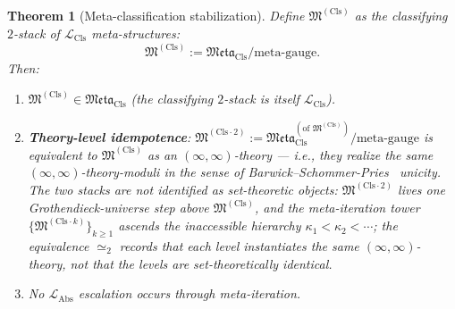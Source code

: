\documentclass[11pt]{article}
\theoremstyle{plain}
\newtheorem{theorem}{Theorem}[section]
\theoremstyle{definition}
\newcommand{\fM}{\mathfrak{M}}
\newcommand{\Meta}{\mathfrak{Meta}}
\newcommand{\LCls}{\mathcal{L}_{\mathrm{Cls}}}
\newcommand{\LAbs}{\mathcal{L}_{\mathrm{Abs}}}
\begin{document}
\begin{theorem}[Meta-classification stabilization]\label{thm:meta-stab}
Define $\fM^{(\mathrm{Cls})}$ as the classifying $2$-stack of $\LCls$ meta-structures:
\[ \fM^{(\mathrm{Cls})} := \Meta_{\mathrm{Cls}} / \text{meta-gauge}. \]
Then:
\begin{enumerate}
\item[\textbf{(a)}] $\fM^{(\mathrm{Cls})} \in \Meta_{\mathrm{Cls}}$ (the classifying $2$-stack is itself $\LCls$).
\item[\textbf{(b)}] \textbf{Theory-level idempotence}: $\fM^{(\mathrm{Cls}\cdot 2)} := \Meta_{\mathrm{Cls}}^{(\text{of }\fM^{(\mathrm{Cls})})} / \text{meta-gauge}$ is equivalent to $\fM^{(\mathrm{Cls})}$ \emph{as an $(\infty, \infty)$-theory} --- i.e., they realize the same $(\infty, \infty)$-theory-moduli in the sense of Barwick--Schommer-Pries~\cite{BarwickSchommerPries2021} unicity. The two stacks are \emph{not} identified as set-theoretic objects: $\fM^{(\mathrm{Cls}\cdot 2)}$ lives one Grothendieck-universe step above $\fM^{(\mathrm{Cls})}$, and the meta-iteration tower $\{\fM^{(\mathrm{Cls}\cdot k)}\}_{k \geq 1}$ ascends the inaccessible hierarchy $\kappa_1 < \kappa_2 < \cdots$; the equivalence $\simeq_2$ records that each level instantiates the same $(\infty, \infty)$-theory, not that the levels are set-theoretically identical.
\item[\textbf{(c)}] No $\LAbs$ escalation occurs through meta-iteration.
\end{enumerate}
\end{theorem}
\end{document}
